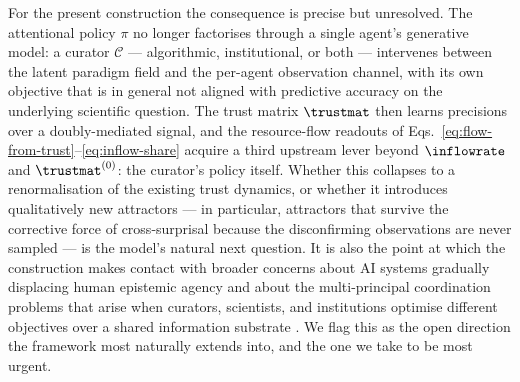 For the present construction the consequence is precise but unresolved. The
attentional policy $\pi$ no longer factorises through a single agent's
generative model: a curator $\mathcal{C}$ --- algorithmic, institutional, or
both --- intervenes between the latent paradigm field and the per-agent
observation channel, with its own objective that is in general not aligned
with predictive accuracy on the underlying scientific question. The
trust matrix $\trustmat$ then learns precisions over a doubly-mediated
signal, and the resource-flow readouts of Eqs.~\eqref{eq:flow-from-trust}--\eqref{eq:inflow-share}
acquire a third upstream lever beyond $\inflowrate$ and $\trustmat^{(0)}$:
the curator's policy itself. Whether this collapses to a renormalisation of
the existing trust dynamics, or whether it introduces qualitatively new
attractors --- in particular, attractors that survive the corrective force
of cross-surprisal because the disconfirming observations are never sampled ---
is the model's natural next question. It is also the point at which the
construction makes contact with broader concerns about AI systems gradually
displacing human epistemic agency \citep{kulveit2025GradualDisempowerment} and
about the multi-principal coordination problems that arise when curators,
scientists, and institutions optimise different objectives over a shared
information substrate \citep{critchKrueger2020ARCHES}. We flag this as the
open direction the framework most naturally extends into, and the one we
take to be most urgent.
